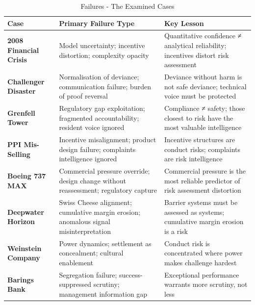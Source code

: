 \begin{table}[H]
  \centering
  \renewcommand{\arraystretch}{1.5}
  \begin{tabularx}{\textwidth}{ | >{\raggedright\arraybackslash}p{} 
								| >{\raggedright\arraybackslash}p{} 
                                | >{\raggedright\arraybackslash}X | }
    \hline
    \textbf{Case} & \textbf{Primary Failure Type} & \textbf{Key Lesson} \\
    \hline
    \textbf{2008 Financial Crisis} & Model uncertainty; incentive distortion; complexity opacity & Quantitative confidence ≠ analytical reliability; incentives distort risk assessment\\
    \hline
    \textbf{Challenger Disaster} & Normalisation of deviance; communication failure; burden of proof reversal & Deviance without harm is not safe deviance; technical voice must be protected\\
    \hline
    \textbf{Grenfell Tower} & Regulatory gap exploitation; fragmented accountability; resident voice ignored & Compliance ≠ safety; those closest to risk have the most valuable intelligence\\
    \hline
    \textbf{PPI Mis-Selling} & Incentive misalignment; product design failure; complaints intelligence ignored & Incentive structures are conduct risks; complaints are risk intelligence\\
    \hline
    \textbf{Boeing 737 MAX} & Commercial pressure override; design change without reassessment; regulatory capture & Commercial pressure is the most reliable predictor of risk assessment distortion\\
    \hline
    \textbf{Deepwater Horizon} & Swiss Cheese alignment; cumulative margin erosion; anomalous signal misinterpretation & Barrier systems must be assessed as systems; cumulative margin erosion is a risk\\
    \hline
    \textbf{Weinstein Company} & Power dynamics; settlement as concealment; cultural enablement & Conduct risk is concentrated where power makes challenge hardest\\
    \hline
    \textbf{Barings Bank} & Segregation failure; success-suppressed scrutiny; management information gap & Exceptional performance warrants more scrutiny, not less\\
    \hline
  \end{tabularx}
  \caption{Failures - The Examined Cases}
\end{table}

